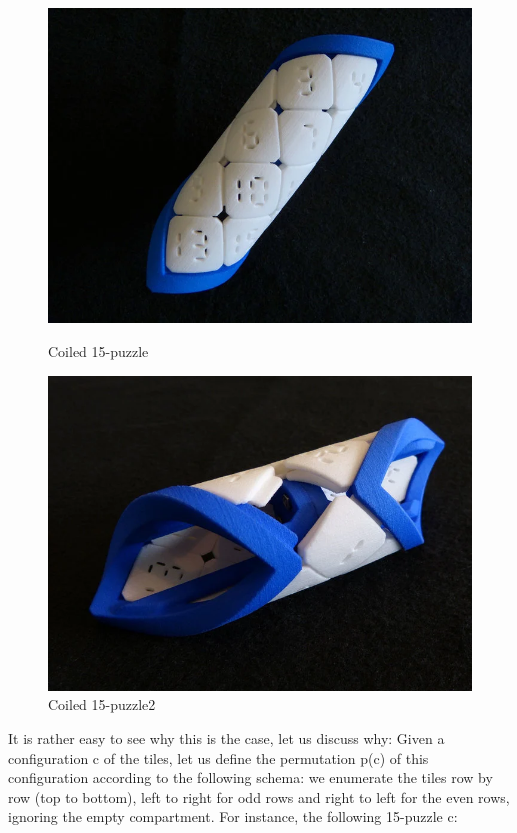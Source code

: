 \begin{figure}[H]
\centering
\includegraphics[scale=0.3]{./Figures/coiled15puzzle}
\decoRule
\caption[Coiled 15-puzzle]{Coiled 15-puzzle}
\centering
%
\includegraphics[scale=0.3]{./Figures/coiled15puzzle2.png}
\decoRule
\caption[Coiled 15-puzzle]{Coiled 15-puzzle2}
\label{fig:Coiled15Puzzle}
\end{figure}




It is rather easy to see why this is the case, let us discuss why: Given a configuration c of the tiles, let us define the permutation p(c) of this configuration according to the following schema: we enumerate the tiles row by row (top to bottom), left to right for odd rows and right to left for the even rows, ignoring the empty compartment. For instance, the following 15-puzzle c:

